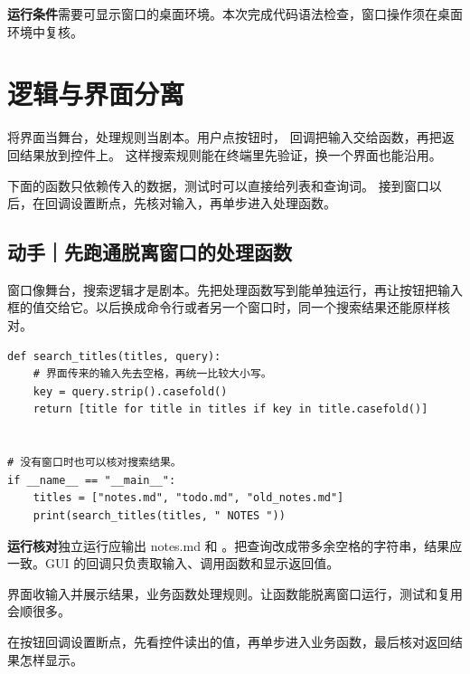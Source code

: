 \documentclass[UTF8,a4paper,oneside,openany,fontset=none,11pt]{ctexbook}
\newcommand{\code}[1]{\texttt{\detokenize{#1}}}
\begin{document}
\textbf{运行条件}\enspace 需要可显示窗口的桌面环境。本次完成代码语法检查，窗口操作须在桌面环境中复核。


\section{逻辑与界面分离}

将界面当舞台，处理规则当剧本。用户点按钮时，
回调把输入交给函数，再把返回结果放到控件上。
这样搜索规则能在终端里先验证，换一个界面也能沿用。

下面的函数只依赖传入的数据，测试时可以直接给列表和查询词。
接到窗口以后，在回调设置断点，先核对输入，再单步进入处理函数。

\subsection*{动手｜先跑通脱离窗口的处理函数}

窗口像舞台，搜索逻辑才是剧本。先把处理函数写到能单独运行，再让按钮把输入框的值交给它。以后换成命令行或者另一个窗口时，同一个搜索结果还能原样核对。

\begin{lstlisting}[title={\code{search_titles.py}}]
def search_titles(titles, query):
    # 界面传来的输入先去空格，再统一比较大小写。
    key = query.strip().casefold()
    return [title for title in titles if key in title.casefold()]


# 没有窗口时也可以核对搜索结果。
if __name__ == "__main__":
    titles = ["notes.md", "todo.md", "old_notes.md"]
    print(search_titles(titles, " NOTES "))
\end{lstlisting}

\textbf{运行核对}\enspace 独立运行应输出 notes.md 和 \code{old_notes.md}。把查询改成带多余空格的字符串，结果应一致。GUI 的回调只负责取输入、调用函数和显示返回值。

\begin{myunderstanding}
界面收输入并展示结果，业务函数处理规则。让函数能脱离窗口运行，测试和复用会顺很多。
\end{myunderstanding}

\begin{pycharmpractice}
在按钮回调设置断点，先看控件读出的值，再单步进入业务函数，最后核对返回结果怎样显示。
\end{pycharmpractice}
\end{document}
